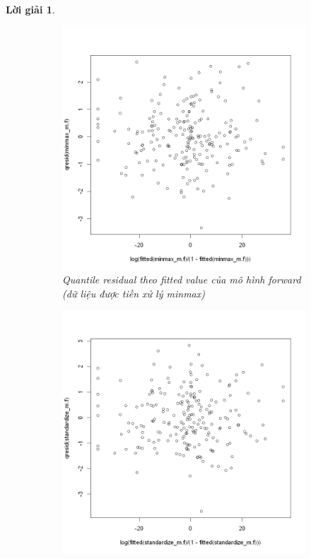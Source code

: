 \documentclass[14pt, a4paper]{article}
\theoremstyle{sltheorem}
\theoremstyle{soltheorem}
\newtheorem*{loigiai}{Lời giải}
\begin{document}
\begin{loigiai}
    \begin{figure}[h!]
        \centering
        \begin{subfigure}[b]{0.4\textwidth}
            \centering
            \includegraphics[width=\textwidth]{figures/minmax_mf_fitted.png}
            \caption{Quantile residual theo fitted value của mô hình forward (dữ liệu được tiền xử lý minmax)}
        \end{subfigure}
        \hfill
        \begin{subfigure}[b]{0.4\textwidth}
            \centering
            \includegraphics[width=\textwidth]{figures/standardize_mf_fitted.png}

\end{subfigure}
\end{figure}
\end{loigiai}
\end{document}
